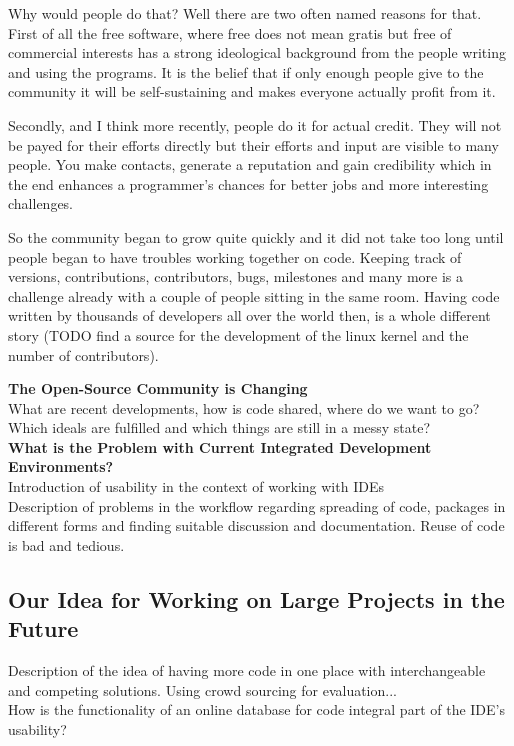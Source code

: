 \documentclass[twoside, 11pt]{scrartcl}
\begin{document}
Why would people do that?
Well there are two often named reasons for that. First of all the free software, where free does not mean gratis but free of commercial interests has a strong ideological background from the people writing and using the programs. It is the belief that if only enough people give to the community it will be self-sustaining and makes everyone actually profit from it. 

Secondly, and I think more recently, people do it for actual credit. They will not be payed for their efforts directly but their efforts and input are visible to many people. You make contacts, generate a reputation and gain credibility which in the end enhances a programmer's chances for better jobs and more interesting challenges.

So the community began to grow quite quickly and it did not take too long until people began to have troubles working together on code. Keeping track of versions, contributions, contributors, bugs, milestones and many more is a challenge already with a couple of people sitting in the same room. Having code written by thousands of developers all over the world then, is a whole different story (TODO find a  source for the development of the linux kernel and the number of contributors).




\textbf{The Open-Source Community is Changing}\\
What are recent developments, how is code shared, where do we want to go?
Which ideals are fulfilled and which  things are still in a messy state?\\

\textbf{What is the Problem with Current Integrated Development Environments?}\\
Introduction of usability in the context of working with IDEs\\
Description of problems in the workflow regarding spreading of code, packages in different forms and finding suitable discussion and documentation. Reuse of code is bad and tedious.


\subsection{Our Idea for Working on Large Projects in the Future}
Description of the idea of having more code in one place with interchangeable and competing solutions. Using crowd sourcing for evaluation...\\
How is the functionality of an online database for code integral part of the IDE's usability?\\
\end{document}
